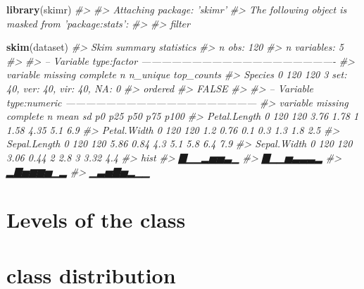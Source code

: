 \documentclass[]{book}
\newenvironment{Shaded}{\begin{snugshade}}{\end{snugshade}}
\newcommand{\CommentTok}[1]{\textcolor[rgb]{0.56,0.35,0.01}{\textit{#1}}}
\newcommand{\KeywordTok}[1]{\textcolor[rgb]{0.13,0.29,0.53}{\textbf{#1}}}
\newcommand{\NormalTok}[1]{#1}
\newcommand{\OperatorTok}[1]{\textcolor[rgb]{0.81,0.36,0.00}{\textbf{#1}}}
\begin{document}
\begin{Shaded}
\begin{Highlighting}[]
\KeywordTok{library}\NormalTok{(skimr)}
\CommentTok{#> }
\CommentTok{#> Attaching package: 'skimr'}
\CommentTok{#> The following object is masked from 'package:stats':}
\CommentTok{#> }
\CommentTok{#>     filter}

\KeywordTok{skim}\NormalTok{(dataset)}
\CommentTok{#> Skim summary statistics}
\CommentTok{#>  n obs: 120 }
\CommentTok{#>  n variables: 5 }
\CommentTok{#> }
\CommentTok{#> -- Variable type:factor ----------------------------------------------------------}
\CommentTok{#>  variable missing complete   n n_unique                       top_counts}
\CommentTok{#>   Species       0      120 120        3 set: 40, ver: 40, vir: 40, NA: 0}
\CommentTok{#>  ordered}
\CommentTok{#>    FALSE}
\CommentTok{#> }
\CommentTok{#> -- Variable type:numeric ---------------------------------------------------------}
\CommentTok{#>      variable missing complete   n mean   sd  p0  p25  p50  p75 p100}
\CommentTok{#>  Petal.Length       0      120 120 3.76 1.78 1   1.58 4.35 5.1   6.9}
\CommentTok{#>   Petal.Width       0      120 120 1.2  0.76 0.1 0.3  1.3  1.8   2.5}
\CommentTok{#>  Sepal.Length       0      120 120 5.86 0.84 4.3 5.1  5.8  6.4   7.9}
\CommentTok{#>   Sepal.Width       0      120 120 3.06 0.44 2   2.8  3    3.32  4.4}
\CommentTok{#>      hist}
\CommentTok{#>  ▇▁▁▂▅▅▃▁}
\CommentTok{#>  ▇▁▁▅▃▃▃▂}
\CommentTok{#>  ▂▇▅▆▆▅▁▂}
\CommentTok{#>  ▁▃▅▇▅▂▁▁}
\end{Highlighting}
\end{Shaded}

\hypertarget{levels-of-the-class}{%
\section{Levels of the class}\label{levels-of-the-class}}

\begin{Shaded}
\end{Shaded}

\hypertarget{class-distribution}{%
\section{class distribution}\label{class-distribution}}
\end{document}

